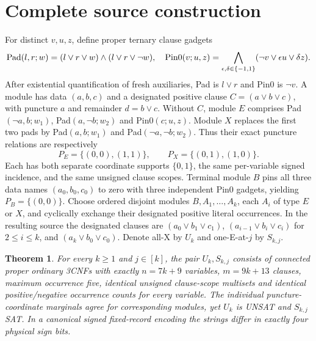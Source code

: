 \documentclass[11pt]{article}
\newtheorem{theorem}{Theorem}
\begin{document}
\section{Complete source construction}
For distinct $v,u,z$, define proper ternary clause gadgets
\[
 {\rm Pad}(l,r;w)=(l\vee r\vee w)\wedge(l\vee r\vee\neg w),\quad
 {\rm Pin0}(v;u,z)=\bigwedge_{\epsilon,\delta\in\{-1,1\}}(\neg v\vee\epsilon u\vee\delta z).
\]
After existential quantification of fresh auxiliaries, Pad is $l\vee r$ and Pin0 is $\neg v$. A module has data $(a,b,c)$ and a designated positive clause $C=(a\vee b\vee c)$, with puncture $a$ and remainder $d=b\vee c$. Without $C$, module $E$ comprises Pad$(\neg a,b;w_1)$, Pad$(a,\neg b;w_2)$ and Pin0$(c;u,z)$. Module $X$ replaces the first two pads by Pad$(a,b;w_1)$ and Pad$(\neg a,\neg b;w_2)$. Thus their exact puncture relations are respectively
\[
 P_E=\{(0,0),(1,1)\},\qquad P_X=\{(0,1),(1,0)\}.
\]
Each has both separate coordinate supports $\{0,1\}$, the same per-variable signed incidence, and the same unsigned clause scopes. Terminal module $B$ pins all three data names $(a_0,b_0,c_0)$ to zero with three independent Pin0 gadgets, yielding $P_B=\{(0,0)\}$. Choose ordered disjoint modules $B,A_1,\ldots,A_k$, each $A_i$ of type $E$ or $X$, and cyclically exchange their designated positive literal occurrences. In the resulting source the designated clauses are $(a_0\vee b_1\vee c_1)$, $(a_{i-1}\vee b_i\vee c_i)$ for $2\le i\le k$, and $(a_k\vee b_0\vee c_0)$. Denote all-X by $U_k$ and one-E-at-$j$ by $S_{k,j}$.
\begin{theorem}
For every $k\ge1$ and $j\in[k]$, the pair $U_k,S_{k,j}$ consists of connected proper ordinary 3CNFs with exactly $n=7k+9$ variables, $m=9k+13$ clauses, maximum occurrence five, identical unsigned clause-scope multisets and identical positive/negative occurrence counts for every variable. The individual puncture-coordinate marginals agree for corresponding modules, yet $U_k$ is UNSAT and $S_{k,j}$ SAT. In a canonical signed fixed-record encoding the strings differ in exactly four physical sign bits.
\end{theorem}
\end{document}
